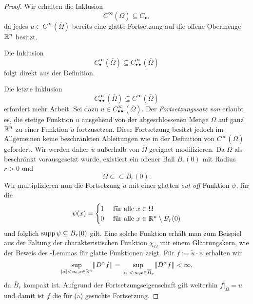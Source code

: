 \begin{proof}
  Wir erhalten die Inklusion
  $$
  C^\infty(\overline\Omega) \subseteq C_{\bullet},
  $$ 
  da jedes $u\in C^\infty(\overline\Omega)$ bereits eine glatte Fortsetzung auf die offene Obermenge $\mathbb{R}^n$ besitzt.

  Die Inklusion $$C^\infty_{\bullet}(\overline\Omega) \subseteq C^\infty_{\bullet\bullet}(\overline\Omega)$$ folgt direkt aus der Definition.
  
  Die letzte Inklusion $$C^\infty_{\bullet\bullet}(\overline\Omega) \subseteq C^\infty(\overline\Omega)$$ erfordert mehr Arbeit.
  Sei dazu $u \in C^\infty_{\bullet\bullet}(\overline\Omega)$.
  Der \emph{Fortsetzungssatz von \stein} \cite[S.172, Proposition 2.2]{stein1970singular} erlaubt es, die stetige Funktion $u$ ausgehend von der abgeschlossenen Menge $\overline\Omega$ auf ganz $\mathbb{R}^n$ zu einer Funktion $\tilde u$ fortzusetzen.
  Diese Fortsetzung besitzt jedoch im Allgemeinen keine beschränkten Ableitungen wie in der Definition von $C^\infty(\overline\Omega)$ gefordert.
  Wir werden daher $\tilde u$ außerhalb von $\overline\Omega$ geeignet modifizieren.
  Da $\Omega$ als beschränkt vorausgesetzt wurde, existiert ein offener Ball $B_r(0)$ mit Radius $r > 0$ und 
  $$
   \Omega \subset\subset B_r(0).
  $$ 
  Wir multiplizieren nun die Fortsetzung $\tilde u$ mit einer glatten \emph{cut-off}\hyp{}Funktion $\psi$, für die
  $$ 
  \psi(x) = \begin{cases}
                          1 &\text{ für alle } x \in \overline\Omega \\
                          0 &\text{ für alle } x \in \mathbb{R}^n \setminus B_r(0)
             \end{cases}
  $$
  und folglich $\operatorname{supp} \psi \subseteq B_r(0)$ gilt.
  Eine solche Funktion erhält man zum Beispiel aus der Faltung der charakteristischen Funktion $\chi_{\overline\Omega}$ mit einem Glättungskern, wie der Beweis des \urysohn\hyp{}Lemmas für glatte Funktionen zeigt. \cite[S.88, Proposition 6.5]{folland2009ra}
  Für $f := \tilde u \cdot \psi$ erhalten wir
  $$
  \sup_{|\alpha| < \infty, x \in \mathbb{R}^n}\lVert  D^\alpha f \rVert
   = \sup_{|\alpha| < \infty, x \in \overline B_r}\lVert  D^\alpha f \rVert
   < \infty,
  $$
  da $\overline B_r$ kompakt ist.
  Aufgrund der Fortsetzungseigenschaft gilt weiterhin $f|_{\overline\Omega} = u$ und damit ist $f$ die für (a) gesuchte Fortsetzung.
\end{proof}

